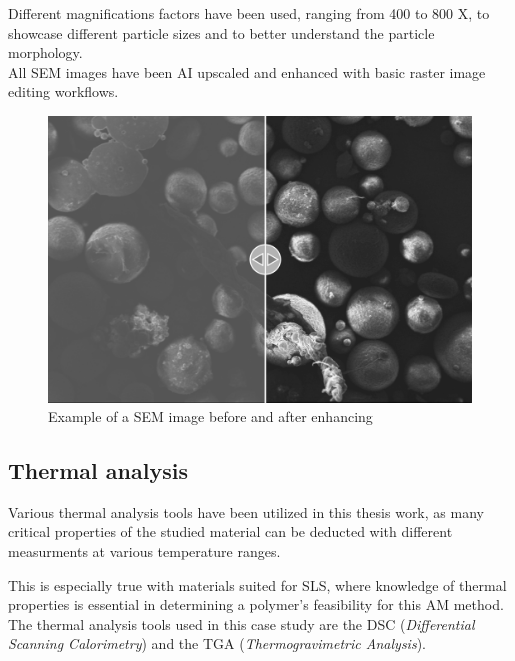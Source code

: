 \documentclass{article}
\begin{document}
            Different magnifications factors have been used, ranging from 400 to 800 X, to showcase different particle sizes and to better understand 
            the particle morphology. \\

            All SEM images have been AI upscaled and enhanced with basic raster image editing workflows. \\ 

                \begin{figure}[h!]
                    \centering
                    \includegraphics[width=\textwidth]{Pictures/SEM/Edited/unedited_vs_edited.png}
                    \caption{Example of a SEM image before and after enhancing \autocites{Inkscape}{Pixelmator_Pro}}
                    \label{fig:SEM_edited_vs_unedited}
                \end{figure}

            \clearpage

            \subsection{Thermal analysis\label{Thermal_analysis}}
    
            Various thermal analysis tools have been utilized in this thesis work, as many critical properties of the studied material 
            can be deducted with different measurments at various temperature ranges. 

            This is especially true with materials suited for SLS, where knowledge of thermal properties is 
            essential in determining a polymer's feasibility for this AM method. 
            The thermal analysis tools used in this case study are the DSC (\textit{Differential Scanning Calorimetry}) and the TGA
            (\textit{Thermogravimetric Analysis}). \\
\end{document}
